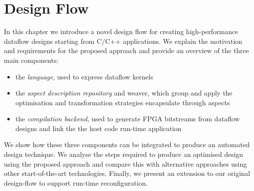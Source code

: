 \chapter{Design Flow}
\label{sec:design-flow}

In this chapter we introduce a novel design flow for creating
high-performance dataflow designs starting from C/C++ applications. We
explain the motivation and requirements for the proposed approach and
provide an overview of the three main components:
\begin{itemize}
\item the \emph{\FAST{} language}, used to express dataflow kernels
\item the \emph{aspect description repository} and weaver, which group
  and apply the optimisation and transformation strategies encapsulate
  through aspects
\item the \emph{compilation backend}, used to generate FPGA bitstreams
  from dataflow designs and link the the host code run-time
  application
\end{itemize}
We show how these three components can be integrated to produce an
automated design technique. We analyse the steps required to produce
an optimised design using the proposed approach and compare this with
alternative approaches using other start-of-the-art
technologies. Finally, we present an extension to our original
design-flow to support run-time reconfiguration.

